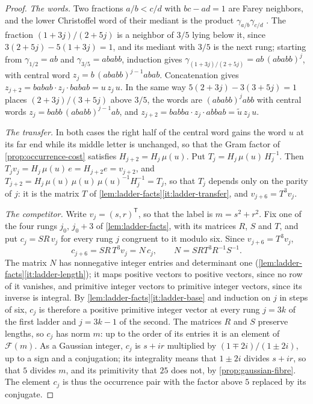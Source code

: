 \begin{proof}
\emph{The words.} Two fractions $a/b<c/d$ with $bc-ad=1$ are Farey
neighbors, and the lower Christoffel word of their mediant is the
product $\gamma_{a/b}\gamma_{c/d}$ \cite{Reutenauer2009}. The fraction
$(1+3j)/(2+5j)$ is a neighbor of $3/5$ lying below it, since
$3(2+5j)-5(1+3j)=1$, and its mediant with $3/5$ is the next rung; starting
from $\gamma_{1/2}=ab$ and $\gamma_{3/5}=ababb$, induction gives
$\gamma_{(1+3j)/(2+5j)}=ab\,(ababb)^j$, with central word
$z_j=b\,(ababb)^{j-1}abab$. Concatenation gives
$z_{j+2}=babab\cdot z_j\cdot babab=u\,z_j\,u$. In the same way
$5(2+3j)-3(3+5j)=1$ places $(2+3j)/(3+5j)$ above $3/5$, the words are
$(ababb)^jabb$ with central words $z_j=babb\,(ababb)^{j-1}ab$, and
$z_{j+2}=babba\cdot z_j\cdot abbab=\widetilde u\,z_j\,u$.

\emph{The transfer.} In both cases the right half of the central word gains
the word $u$ at its far end while its middle letter is unchanged, so that
the Gram factor of \cref{prop:occurrence-cost} satisfies
$H_{j+2}=H_j\,\mu(u)$. Put $T_j=H_j\,\mu(u)\,H_j^{-1}$. Then
$T_jv_j=H_j\,\mu(u)\,e=H_{j+2}e=v_{j+2}$, and
$T_{j+2}=H_j\,\mu(u)\,\mu(u)\,\mu(u)^{-1}H_j^{-1}=T_j$, so that $T_j$ depends only
on the parity of $j$: it is the matrix $T$ of \cref{lem:ladder-facts}\ref{it:ladder-transfer}, and
$v_{j+6}=T^3v_j$.

\emph{The competitor.} Write $v_j=(s,r)^{\mathsf T}$, so that the label is
$m=s^2+r^2$. Fix one of the four rungs $j_0$, $j_0+3$ of
\cref{lem:ladder-facts}, with its matrices $R$, $S$ and $T$, and put
$c_j=SR\,v_j$ for every rung $j$ congruent to it modulo six. Since
$v_{j+6}=T^3v_j$,
$$
 c_{j+6}=SR\,T^3v_j=N\,c_j,\qquad N=SRT^3R^{-1}S^{-1}.
$$
The matrix $N$ has nonnegative integer entries and determinant one
(\cref{lem:ladder-facts}\ref{it:ladder-length}); it maps positive vectors to positive
vectors, since no row of it vanishes, and primitive integer vectors to
primitive integer vectors, since its inverse is integral. By
\cref{lem:ladder-facts}\ref{it:ladder-base} and induction on $j$ in steps of six, $c_j$ is
therefore a positive primitive integer vector at every rung $j=3k$ of the
first ladder and $j=3k-1$ of the second. The matrices $R$ and $S$ preserve
lengths, so $c_j$ has norm $m$: up to the order of its entries it is an
element of $\mathcal F(m)$. As a Gaussian integer, $c_j$ is $s+ir$ multiplied
by $(1\mp2i)/(1\pm2i)$, up to a sign and a conjugation; its integrality means
that $1\pm2i$ divides $s+ir$, so that $5$ divides $m$, and its primitivity that
$25$ does not, by \cref{prop:gaussian-fibre}. The element $c_j$ is thus the
occurrence pair with the factor above $5$ replaced by its conjugate.


\end{proof}
